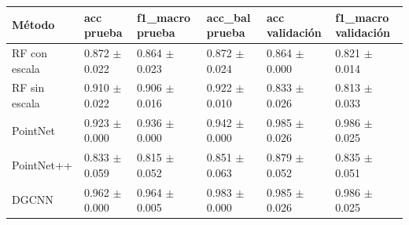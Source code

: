 \begin{tabular}{llllll}
\toprule
Método & acc prueba & f1_macro prueba & acc_bal prueba & acc validación & f1_macro validación \\
\midrule
RF con escala & 0.872 $\pm$ 0.022 & 0.864 $\pm$ 0.023 & 0.872 $\pm$ 0.024 & 0.864 $\pm$ 0.000 & 0.821 $\pm$ 0.014 \\
RF sin escala & 0.910 $\pm$ 0.022 & 0.906 $\pm$ 0.016 & 0.922 $\pm$ 0.010 & 0.833 $\pm$ 0.026 & 0.813 $\pm$ 0.033 \\
PointNet & 0.923 $\pm$ 0.000 & 0.936 $\pm$ 0.000 & 0.942 $\pm$ 0.000 & 0.985 $\pm$ 0.026 & 0.986 $\pm$ 0.025 \\
PointNet++ & 0.833 $\pm$ 0.059 & 0.815 $\pm$ 0.052 & 0.851 $\pm$ 0.063 & 0.879 $\pm$ 0.052 & 0.835 $\pm$ 0.051 \\
DGCNN & 0.962 $\pm$ 0.000 & 0.964 $\pm$ 0.005 & 0.983 $\pm$ 0.000 & 0.985 $\pm$ 0.026 & 0.986 $\pm$ 0.025 \\
\bottomrule
\end{tabular}

